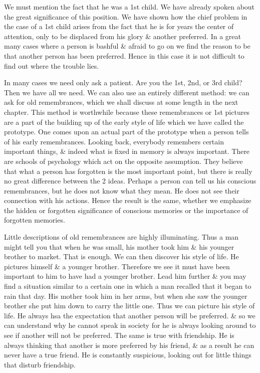 \documentclass{article}
\begin{document}
We must mention the fact that he was a 1st child. We have already spoken about the great significance of this position. We have shown how the chief problem in the case of a 1st child arises from the fact that he is for years the center of attention, only to be displaced from his glory \& another preferred. In a great many cases where a person is bashful \& afraid to go on we find the reason to be that another person has been preferred. Hence in this case it is not difficult to find out where the trouble lies.

In many cases we need only ask a patient. Are you the 1st, 2nd, or 3rd child? Then we have all we need. We can also use an entirely different method: we can ask for old remembrances, which we shall discuss at some length in the next chapter. This method is worthwhile because these remembrances or 1st pictures are a part of the building up of the early style of life which we have called the prototype. One comes upon an actual part of the prototype when a person tells of his early remembrances. Looking back, everybody remembers certain important things, \& indeed what is fixed in memory is always important. There are schools of psychology which act on the opposite assumption. They believe that what a person has forgotten is the most important point, but there is really no great difference between the 2 ideas. Perhaps a person can tell us his conscious remembrances, but he does not know what they mean. He does not see their connection with his actions. Hence the result is the same, whether we emphasize the hidden or forgotten significance of conscious memories or the importance of forgotten memories.

Little descriptions of old remembrances are highly illuminating. Thus a man might tell you that when he was small, his mother took him \& his younger brother to market. That is enough. We can then discover his style of life. He pictures himself \& a younger brother. Therefore we see it must have been important to him to have had a younger brother. Lead him further \& you may find a situation similar to a certain one in which a man recalled that it began to rain that day. His mother took him in her arms, but when she saw the younger brother she put him down to carry the little one. Thus we can picture his style of life. He always hsa the expectation that another person will be preferred. \& so we can understand why he cannot speak in society for he is always looking around to see if another will not be preferred. The same is true with friendship. He is always thinking that another is more preferred by his friend, \& as a result he can never have a true friend. He is constantly suspicious, looking out for little things that disturb friendship.
\end{document}
